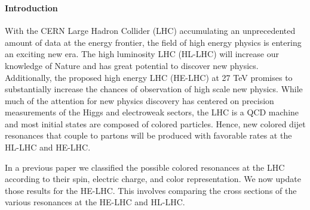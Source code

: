 \subsubsection{}

\newcommand\rep\mathbf

\paragraph*{Introduction}
With the CERN Large Hadron Collider (LHC) accumulating an unprecedented amount of data at the energy frontier, the field of high energy physics is entering an exciting new era. The high luminosity LHC (HL-LHC) will increase our knowledge of Nature and has great potential to discover new physics.  Additionally, the proposed high energy LHC (HE-LHC) at 27 TeV promises to substantially increase the chances of observation of high scale new physics.  While much of the attention for new physics discovery has centered on precision measurements of the Higgs and electroweak sectors, the LHC is a QCD machine and most initial states are composed of colored particles.  Hence, new colored dijet resonances that couple to partons will be produced with favorable rates at the HL-LHC and HE-LHC.

In a previous paper we classified the possible colored resonances at the LHC~\cite{Han:2010rf} according to their spin, electric charge, and color representation.  We now update those results for the HE-LHC.  This involves comparing the cross sections of the various resonances at the HE-LHC and HL-LHC. 

